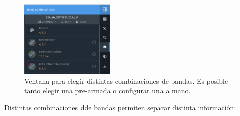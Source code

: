 \documentclass[a4paper,12pt]{book}
\begin{document}
\begin{figure}[h!]
    \centering
    \includegraphics[width=0.4\textwidth]{fig:bandas.png}
    \caption{Ventana para elegir distintas combinaciones de bandas. Es posible tanto elegir una pre-armada o configurar una a mano.}
    \label{fig:bandas}
\end{figure}

Distintas combinaciones dde bandas permiten separar distinta información:
\end{document}
